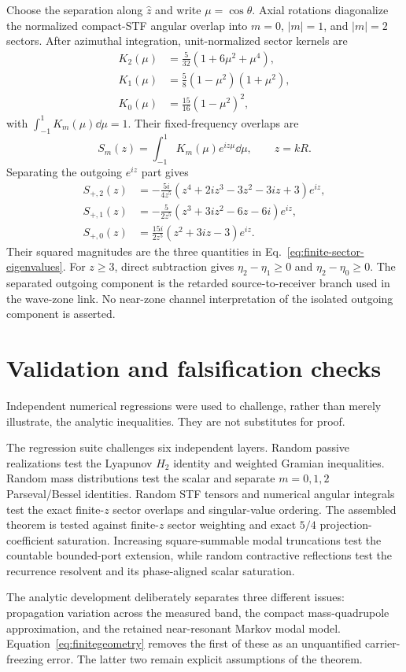 Choose the separation along $\hat z$ and write $\mu=\cos\theta$. Axial rotations diagonalize the normalized compact-STF angular overlap into $m=0$, $|m|=1$, and $|m|=2$ sectors. After azimuthal integration, unit-normalized sector kernels are
\begin{align}
K_2(\mu)&=\frac{5}{32}(1+6\mu^2+\mu^4),\\
K_1(\mu)&=\frac58(1-\mu^2)(1+\mu^2),\\
K_0(\mu)&=\frac{15}{16}(1-\mu^2)^2,
\end{align}
with $\int_{-1}^{1}K_m(\mu)\dd\mu=1$. Their fixed-frequency overlaps are
\begin{equation}
S_m(z)=\int_{-1}^{1}K_m(\mu)e^{iz\mu}\dd\mu,
\qquad z=kR.
\end{equation}
Separating the outgoing $e^{iz}$ part gives
\begin{align}
S_{+,2}(z)&=-\frac{5i}{4z^5}
\left(z^4+2iz^3-3z^2-3iz+3\right)e^{iz},\\
S_{+,1}(z)&=-\frac{5}{2z^5}
\left(z^3+3iz^2-6z-6i\right)e^{iz},\\
S_{+,0}(z)&=\frac{15i}{2z^5}
\left(z^2+3iz-3\right)e^{iz}.
\end{align}
Their squared magnitudes are the three quantities in Eq.~\eqref{eq:finite-sector-eigenvalues}. For $z\ge3$, direct subtraction gives $\eta_2-\eta_1\ge0$ and $\eta_2-\eta_0\ge0$. The separated outgoing component is the retarded source-to-receiver branch used in the wave-zone link. No near-zone channel interpretation of the isolated outgoing component is asserted.

\section{Validation and falsification checks}
\label{app:validation}

Independent numerical regressions were used to challenge, rather than merely illustrate, the analytic inequalities. They are not substitutes for proof.

The regression suite challenges six independent layers. Random passive realizations test the Lyapunov $H_2$ identity and weighted Gramian inequalities. Random mass distributions test the scalar and separate $m=0,1,2$ Parseval/Bessel identities. Random STF tensors and numerical angular integrals test the exact finite-$z$ sector overlaps and singular-value ordering. The assembled theorem is tested against finite-$z$ sector weighting and exact $5/4$ projection-coefficient saturation. Increasing square-summable modal truncations test the countable bounded-port extension, while random contractive reflections test the recurrence resolvent and its phase-aligned scalar saturation.

The analytic development deliberately separates three different issues: propagation variation across the measured band, the compact mass-quadrupole approximation, and the retained near-resonant Markov modal model. Equation~\eqref{eq:finitegeometry} removes the first of these as an unquantified carrier-freezing error. The latter two remain explicit assumptions of the theorem.
